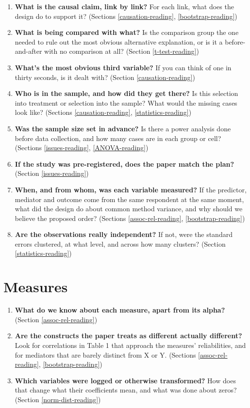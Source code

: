 \documentclass[
]{book}
\providecommand{\tightlist}{%
  \setlength{\itemsep}{0pt}\setlength{\parskip}{0pt}}
\begin{document}
\begin{enumerate}
\def\labelenumi{\arabic{enumi}.}
\tightlist
\item
  \textbf{What is the causal claim, link by link?} For each link, what does the design do to support it? (Sections \ref{causation-reading}, \ref{bootstrap-reading})
\item
  \textbf{What is being compared with what?} Is the comparison group the one needed to rule out the most obvious alternative explanation, or is it a before-and-after with no comparison at all? (Section \ref{t-test-reading})
\item
  \textbf{What's the most obvious third variable?} If you can think of one in thirty seconds, is it dealt with? (Section \ref{causation-reading})
\item
  \textbf{Who is in the sample, and how did they get there?} Is this selection into treatment or selection into the sample? What would the missing cases look like? (Sections \ref{causation-reading}, \ref{statistics-reading})
\item
  \textbf{Was the sample size set in advance?} Is there a power analysis done before data collection, and how many cases are in each group or cell? (Sections \ref{issues-reading}, \ref{ANOVA-reading})
\item
  \textbf{If the study was pre-registered, does the paper match the plan?} (Section \ref{issues-reading})
\item
  \textbf{When, and from whom, was each variable measured?} If the predictor, mediator and outcome come from the same respondent at the same moment, what did the design do about common method variance, and why should we believe the proposed order? (Sections \ref{assoc-rel-reading}, \ref{bootstrap-reading})
\item
  \textbf{Are the observations really independent?} If not, were the standard errors clustered, at what level, and across how many clusters? (Section \ref{statistics-reading})
\end{enumerate}

\section{Measures}\label{measures}

\begin{enumerate}
\def\labelenumi{\arabic{enumi}.}
\setcounter{enumi}{8}
\tightlist
\item
  \textbf{What do we know about each measure, apart from its alpha?} (Section \ref{assoc-rel-reading})
\item
  \textbf{Are the constructs the paper treats as different actually different?} Look for correlations in Table 1 that approach the measures' reliabilities, and for mediators that are barely distinct from X or Y. (Sections \ref{assoc-rel-reading}, \ref{bootstrap-reading})
\item
  \textbf{Which variables were logged or otherwise transformed?} How does that change what their coefficients mean, and what was done about zeros? (Section \ref{norm-dist-reading})
\end{enumerate}
\end{document}
